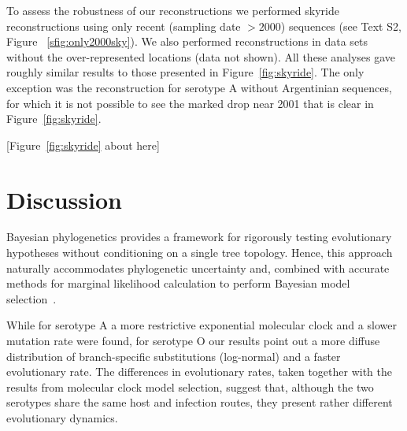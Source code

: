 \documentclass[10pt]{article}
\begin{document}
To assess the robustness of our reconstructions we performed skyride reconstructions using only recent (sampling date $>2000$) sequences (see Text S2, Figure ~\ref{sfig:only2000sky}).
We also performed reconstructions in data sets without the over-represented locations (data not shown). All these analyses gave roughly similar results to those presented in Figure~\ref{fig:skyride}. The only exception was the reconstruction for serotype A without Argentinian sequences, for which it is not possible to see the marked drop near 2001 that is clear in Figure~\ref{fig:skyride}. 

\begin{center}
 [Figure~\ref{fig:skyride} about here]
\end{center}

\section*{Discussion}
Bayesian phylogenetics provides a framework for rigorously testing evolutionary hypotheses without conditioning on a single tree topology. Hence, this approach naturally accommodates phylogenetic uncertainty and, combined with accurate methods for marginal likelihood calculation to perform Bayesian model selection~\cite{Baele2012,Baele2013a,Baele2013b}.

While for serotype A a more restrictive exponential molecular clock and a slower mutation rate were found, for serotype O our results point out a more diffuse distribution of branch-specific substitutions (log-normal) and a faster evolutionary rate.
The differences in evolutionary rates, taken together with the results from molecular clock model selection, suggest that, although the two serotypes share the same host and infection routes, they present rather different evolutionary dynamics. 
\end{document}
